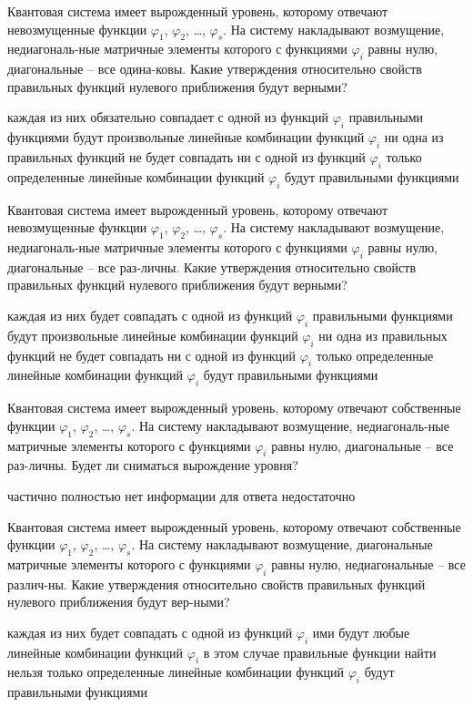 \documentclass[11pt,a4paper]{exam}
\begin{document}
\begin{questions}
\question Квантовая система имеет вырожденный уровень, которому отвечают невозмущенные функции ${\varphi _1}$, ${\varphi _2}$, …, ${\varphi _s}$. На систему накладывают возмущение, недиагональ-ные матричные элементы которого с функциями ${\varphi _i}$ равны нулю, диагональные – все одина-ковы. Какие утверждения относительно свойств правильных функций нулевого приближения будут верными?
\begin{choices}
\choice каждая из них обязательно совпадает с одной из функций ${\varphi _i}$
\choice правильными функциями будут произвольные линейные комбинации функций ${\varphi _i}$
\choice ни одна из правильных функций не будет совпадать ни с одной из функций ${\varphi _i}$
\choice только определенные линейные комбинации функций ${\varphi _i}$ будут правильными функциями 
\end{choices}

\question Квантовая система имеет вырожденный уровень, которому отвечают невозмущенные функции ${\varphi _1}$, ${\varphi _2}$, …, ${\varphi _s}$. На систему накладывают возмущение, недиагональ-ные матричные элементы которого с функциями ${\varphi _i}$ равны нулю, диагональные – все раз-личны. Какие утверждения относительно свойств правильных функций нулевого приближения будут верными?
\begin{choices}
\choice каждая из них будет совпадать с одной из функций ${\varphi _i}$
\choice правильными функциями будут произвольные линейные комбинации функций ${\varphi _i}$
\choice ни одна из правильных функций не будет совпадать ни с одной из функций ${\varphi _i}$
\choice только определенные линейные комбинации функций ${\varphi _i}$ будут правильными функциями
\end{choices}

\question Квантовая система имеет вырожденный уровень, которому отвечают собственные функции ${\varphi _1}$, ${\varphi _2}$, …, ${\varphi _s}$. На систему накладывают возмущение, недиагональ-ные матричные элементы которого с функциями ${\varphi _i}$ равны нулю, диагональные – все раз-личны. Будет ли сниматься вырождение уровня?
\begin{choices}
\choice частично    
\choice полностью      
\choice нет      
\choice информации для ответа недостаточно
\end{choices}

\question Квантовая система имеет вырожденный уровень, которому отвечают собственные функции ${\varphi _1}$, ${\varphi _2}$, …, ${\varphi _s}$. На систему накладывают возмущение, диагональные матричные элементы которого с функциями ${\varphi _i}$ равны нулю, недиагональные – все различ-ны. Какие утверждения относительно свойств правильных функций нулевого приближения будут вер-ными?
\begin{choices}
\choice каждая из них будет совпадать с одной из функций ${\varphi _i}$
\choice ими будут любые линейные комбинации функций ${\varphi _i}$
\choice в этом случае правильные функции найти нельзя
\choice только определенные линейные комбинации функций ${\varphi _i}$ будут правильными функциями
\end{choices}


\end{questions}
\end{document}
